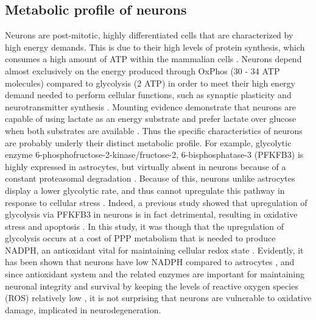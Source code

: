 \subsection{Metabolic profile of neurons}
Neurons are post-mitotic, highly differentiated cells that are characterized by high energy demands. This is due to their high levels of protein synthesis, which consumes a high amount of ATP within the mammalian cells \citep{Buttgereit1995}. Neurons depend almost exclusively on the energy produced through OxPhos (30 - 34 ATP molecules) compared to glycolysis (2 ATP) in order to meet their high energy demand needed to perform cellular functions, such as synaptic plasticity and neurotransmitter synthesis \citep{Cenini2019,Mattson2008,Schonfeld2013}. Mounting evidence demonstrate that neurons are capable of using lactate as an energy substrate \citep{Boumezbeur2010,Bouzier2000,Serres2005} and prefer lactate over glucose when both substrates are available \citep{Bouzier-Sore2006,Itoh2003}. Thus the specific characteristics of neurons are probably underly their distinct metabolic profile. For example, glycolytic enzyme 6-phosphofructose-2-kinase/fructose-2, 6-bisphosphatase-3 (PFKFB3) is highly expressed in astrocytes, but virtually absent in neurons because of a constant proteasomal degradation \citep{Almeida2004,Herrero-Mendez2009}. Because of this, neurons unlike astrocytes display a lower glycolytic rate, and thus cannot upregulate this pathway in response to cellular stress \citep{Almeida2004,Herrero-Mendez2009}. Indeed, a previous study showed that upregulation of glycolysis via PFKFB3 in neurons is in fact detrimental, resulting in oxidative stress and apoptosis \citep{Herrero-Mendez2009}. In this study, it was though that the upregulation of glycolysis occurs at a cost of PPP metabolism that is needed to produce NADPH, an antioxidant vital for maintaining cellular redox state \citep{Herrero-Mendez2009}. Evidently, it has been shown that neurons have low NADPH compared to astrocytes \citep{Ben-Yoseph1996,Garcia-Nogales2003}, and since antioxidant system and the related enzymes are important for maintaining neuronal integrity and survival by keeping the levels of reactive oxygen species (ROS) relatively low \citep{Cenini2019}, it is not surprising that neurons are vulnerable to oxidative damage, implicated in neurodegeneration.

